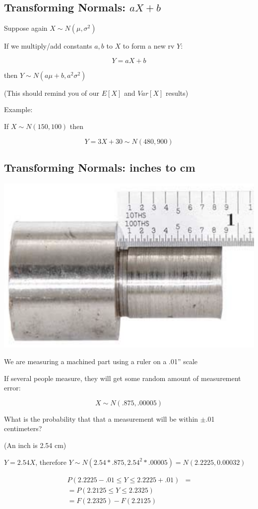 \documentclass[
  letterpaper,
  DIV=11,
  numbers=noendperiod]{scrartcl}
\begin{document}
\subsection{\texorpdfstring{Transforming Normals:
\(aX + b\)}{Transforming Normals: aX + b}}\label{transformingNormals}

Suppose again \(X \sim N(\mu, \sigma^2)\)

If we multiply/add constants \(a,b\) to \(X\) to form a new rv \(Y\):

\[
Y  = aX + b 
\]

then \(Y \sim N(a\mu + b, a^2 \sigma^2)\)

{(This should remind you of our \(E[X]\) and \(Var[X]\) results)}

{Example:}

If \(X \sim N(150,100)\) then

\[
Y = 3X + 30 \sim N(480, 900)
\]

\subsection{Transforming Normals: inches to
cm}\label{transforming-normals-inches-to-cm}

\includegraphics[width=0.5\linewidth,height=\textheight,keepaspectratio]{figures/steelRuler.png}

We are measuring a machined part using a ruler on a .01'' scale

If several people measure, they will get some random amount of
measurement error:

\[
X \sim N(.875, .00005)
\]

What is the probability that that a measurement will be within
\(\pm\).01 centimeters?

{(An inch is 2.54 cm)}

\(Y = 2.54X\), therefore
\(Y \sim N(2.54*.875,  2.54^2*.00005) = N(2.2225,  0.00032)\)

\[
\begin{align}
P(2.2225 - .01 \leq Y \leq 2.2225 + .01) & = \\
 = P(2.2125 \leq Y \leq 2.2325) & \\
 = F(2.2325) - F(2.2125)
\end{align}
\]
\end{document}
